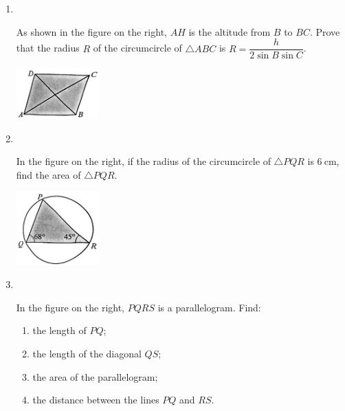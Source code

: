 \documentclass{report}
\begin{document}
\begin{enumerate}
        \item \parbox[t]{0.9\textwidth}{
            ~
            \vspace{-1.1em}
            \begin{vwcol}[widths={0.6,0.4}, sep=8mm, rule=0pt]
                As shown in the figure on the right, $AH$ is the altitude from $B$ to $BC$. Prove that the radius $R$ of the circumcircle of $\triangle ABC$ is $R=\dfrac{h}{2\sin B \sin C}$.
    
                \includegraphics[width=0.25\textwidth]{assets/10-79.jpg}
            \end{vwcol}
        }

        \vspace{2em}
        \item \parbox[t]{0.9\textwidth}{
            ~
            \vspace{-1.1em}
            \begin{vwcol}[widths={0.6,0.4}, sep=8mm, rule=0pt]
                In the figure on the right, if the radius of the circumcircle of $\triangle PQR$ is $6 \mathrm{~cm}$, find the area of $\triangle PQR$.

                \includegraphics[width=0.25\textwidth]{assets/10-80.jpg}
            \end{vwcol}
            }

        \vspace{4em}    
        \item \parbox[t]{0.9\textwidth}{
            ~
            \vspace{-1.1em}
            \begin{vwcol}[widths={0.6,0.4}, sep=8mm, rule=0pt]
                In the figure on the right, $PQRS$ is a parallelogram. Find:

                \noindent \parbox[t]{0.5\textwidth}{
                    \begin{enumerate}
                        \item the length of $PQ$;
                        \item the length of the diagonal $QS$;
                        \item the area of the parallelogram;
                        \item the distance between the lines $PQ$ and $RS$.
                    \end{enumerate}
                }
        

\end{vwcol}}
\end{enumerate}
\end{document}
